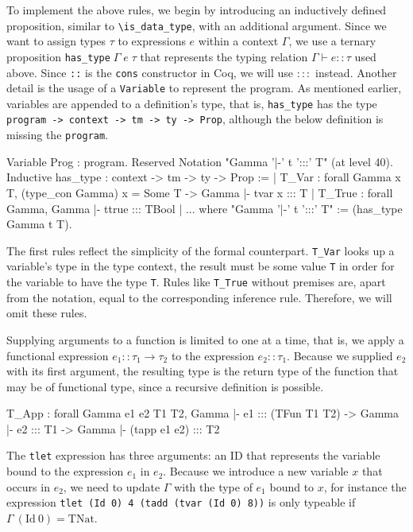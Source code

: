 \documentclass[paper = a4, fleqn, abstract=on, twoside]{scrreprt}
\newcommand{\coqinline}[1]{\texttt{#1}}
\begin{document}
\par
To implement the above rules, we begin by introducing an inductively defined proposition, similar to \texttt{\textbackslash is\_data\_type}, with an additional argument. Since we want to assign types $\tau$ to expressions $e$ within a context $\Gamma$, we use a ternary proposition \coqinline{has_type}$\; \Gamma \; e \; \tau$ that represents the typing relation $\Gamma \vdash e :: \tau$ used above. Since \coqinline{::} is the \coqinline{cons} constructor in Coq, we will use $:::$ instead. Another detail is the usage of a \coqinline{Variable} to represent the program. As mentioned earlier, variables are appended to a definition's type, that is, \coqinline{has_type} has the type \coqinline{program -> context -> tm -> ty -> Prop}, although the below definition is missing the \coqinline{program}.
\begin{coqcode}
Variable Prog : program.
Reserved Notation "Gamma '|-' t ':::' T" (at level 40).
Inductive has_type : context -> tm -> ty -> Prop :=
  | T_Var  : forall Gamma x T, (type_con Gamma) x = Some T ->
              Gamma |- tvar x ::: T
  | T_True : forall Gamma, Gamma |- ttrue ::: TBool
  | ...
where "Gamma '|-' t ':::' T" := (has_type Gamma t T).
\end{coqcode}
The first rules reflect the simplicity of the formal counterpart. \texttt{T\_Var} looks up a variable's type in the type context, the result must be some value \texttt{T} in order for the variable to have the type \texttt{T}. Rules like \texttt{T\_True} without premises are, apart from the notation, equal to the corresponding inference rule. Therefore, we will omit these rules.
\par
Supplying arguments to a function is limited to one at a time, that is, we apply a functional expression $e_{1} :: \tau_{1} \rightarrow \tau_{2}$ to the expression $e_{2} :: \tau_{1}$. Because we supplied $e_{2}$ with its first argument, the resulting type is the return type of the function that may be of functional type, since a recursive definition is possible.
\begin{coqcode}
T_App : forall Gamma e1 e2 T1 T2,
          Gamma |- e1 ::: (TFun T1 T2) -> Gamma |- e2 ::: T1 ->
          Gamma |- (tapp e1 e2) ::: T2
\end{coqcode}
The \coqinline{tlet} expression has three arguments: an ID that represents the variable bound to the expression $e_{1}$ in $e_{2}$. Because we introduce a new variable $x$ that occurs in $e_{2}$, we need to update $\Gamma$ with the type of $e_{1}$ bound to $x$, for instance the expression \coqinline{tlet (Id 0) 4 (tadd (tvar (Id 0) 8))} is only typeable if $\Gamma \:(\text{Id}\: 0) = \text{TNat}$.
\end{document}
